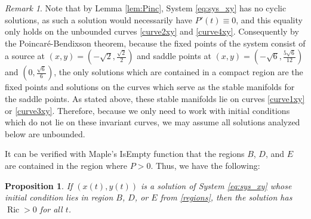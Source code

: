 \documentclass{amsart}
\numberwithin{equation}{section}
\newtheorem{proposition}[equation]{Proposition}
\theoremstyle{plain}
\theoremstyle{definition}
\theoremstyle{remark}
\newtheorem{remark}[equation]{Remark}
\numberwithin{table}{section}
\DeclareMathOperator{\Ric}{Ric}
\begin{document}
    \begin{remark}\label{rem:compact}
        Note that by Lemma \ref{lem:Pinc}, System \eqref{eq:sys_xy} has no cyclic solutions, as such a solution would necessarily have $P'(t) \equiv 0$, and this equality only holds on the unbounded curves \eqref{curve2xy} and \eqref{curve4xy}.
        Consequently by the Poincar\'e-Bendixson theorem, because the fixed points of the system consist of a source at $(x,y)=(-\sqrt{2},\frac{\sqrt{2}}{2})$ and saddle points at $(x,y)=(-\sqrt{6},\frac{5\sqrt{6}}{12})$ and $(0,\frac{\sqrt{6}}{6})$, the only solutions which are contained in a compact region are the fixed points and solutions on the curves which serve as the stable manifolds for the saddle points.
        As stated above, these stable manifolds lie on curves \eqref{curve1xy} or \eqref{curve3xy}.
        Therefore, because we only need to work with initial conditions which do not lie on these invariant curves, we may assume all solutions analyzed below are unbounded.
    \end{remark}

    It can be verified with Maple's IsEmpty function that the regions $B$, $D$, and $E$ are contained in the region where $P>0$.
    Thus, we have the following:
    
    \begin{proposition}
        If $(x(t),y(t))$ is a solution of System \eqref{eq:sys_xy} whose initial condition lies in region $B$, $D$, or $E$ from \eqref{regions}, then the solution has $\Ric>0$ for all $t$.
    \end{proposition} 
    
    
    
\end{document}
